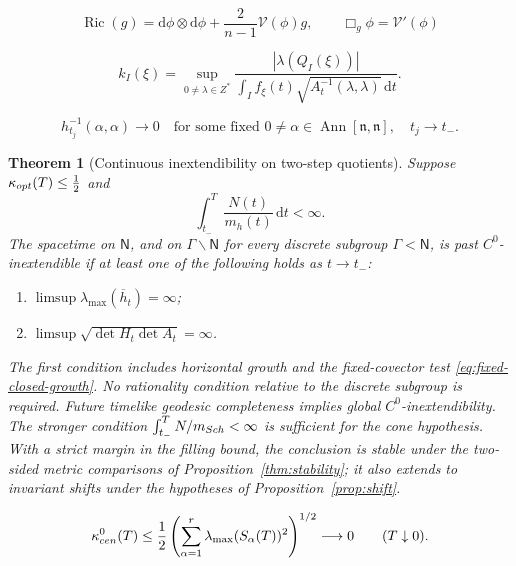\documentclass[10pt,a4paper]{amsart}
\newtheorem{theorem}{Theorem}
\newcommand{\Ric}{\operatorname{Ric}}
\newcommand{\dd}{\mathrm d}
\begin{document}
\begin{equation}
 \Ric(g)=\dd\phi\otimes\dd\phi+
 \frac{2}{n-1}\mathcal V(\phi)g,
 \qquad \Box_g\phi=\mathcal V'(\phi)
 \label{eq:main-einstein-normalization}
\end{equation}

\begin{equation}\label{eq:kappa-opt}
 k_I(\xi)=\sup_{0\ne\lambda\in Z^*}
 \frac{|\lambda(Q_I(\xi))|}
 {\displaystyle\int_I f_\xi(t)
          \sqrt{A_t^{-1}(\lambda,\lambda)}\,\dd t}.
\end{equation}

\begin{equation}
 h_{t_j}^{-1}(\alpha,\alpha)\longrightarrow0
 \quad\text{for some fixed }0\ne\alpha\in
 \operatorname{Ann}[\mathfrak n,\mathfrak n],\quad t_j\to t_-.
 \label{eq:fixed-closed-growth}
\end{equation}

\begin{theorem}[Continuous inextendibility on two-step quotients]
\label{thm:two-step-obstruction}
Suppose $\kappa_{\rm opt}(T)\le\tfrac12$ and
\begin{equation}
 \int_{t_-}^{T}\frac{N(t)}{m_h(t)}\,\dd t<\infty.
 \label{eq:schur-cone-integral}
\end{equation}
The spacetime on $\mathsf N$, and on $\Gamma\backslash\mathsf N$ for
every discrete subgroup $\Gamma<\mathsf N$, is past
$C^0$-inextendible if at least one of the following holds as $t\to t_-$:
\begin{enumerate}[label=\textup{(\roman*)}]
\item $\limsup\lambda_{\max}(\overline h_t)=\infty$;
\item $\limsup\sqrt{\det H_t\det A_t}=\infty$.
\end{enumerate}
The first condition includes horizontal growth and the fixed-covector
test \eqref{eq:fixed-closed-growth}.  No rationality condition relative
to the discrete subgroup is required.  Future timelike geodesic
completeness implies global $C^0$-inextendibility.  The stronger condition
$\int_{t_-}^T N/m_{\rm Sch}<\infty$ is sufficient for the cone hypothesis.
With a strict margin in the filling bound, the conclusion is stable under
the two-sided metric comparisons of Proposition~\ref{thm:stability}; it
also extends to invariant shifts under the hypotheses of
Proposition~\ref{prop:shift}.
\end{theorem}

\begin{equation}
 \kappa_{\rm cen}^0(T)
 \le\frac12\left(\sum_{\alpha=1}^r
       \lambda_{\max}(S_\alpha(T))^2\right)^{1/2}
 \longrightarrow0\qquad(T\downarrow0).
 \label{eq:anisotropic-bracket-matrix-bound}
\end{equation}
\end{document}
